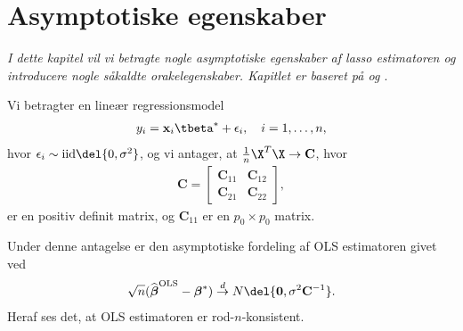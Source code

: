 \chapter{Asymptotiske egenskaber}
\textit{I dette kapitel vil vi betragte nogle asymptotiske egenskaber af lasso estimatoren og introducere nogle såkaldte orakelegenskaber.
Kapitlet er baseret på \cite{adaptive_lasso} og \cite{adaptive_lasso_knight}}.



Vi betragter en lineær regressionsmodel 
\begin{align*}
y_i= \mathbf{x}_i \tbeta^* + \epsilon_i, \quad i = 1, \ldots, n,
\end{align*}
hvor \(\epsilon_i \sim \text{iid} \del{0, \sigma^2}\), og vi antager, at \(\frac{1}{n} \X^T \X \rightarrow \textbf{C}\), hvor
\begin{align*}
\textbf{C} = 
\begin{bmatrix}
\textbf{C}_{11}& \textbf{C}_{12}\\
\textbf{C}_{21}& \textbf{C}_{22}
\end{bmatrix},
\end{align*}
er en positiv definit matrix, og $\textbf{C}_{11}$ er en $p_0 \times p_0$ matrix. 

Under denne antagelse er den asymptotiske fordeling af OLS estimatoren givet ved
\begin{align*}
\sqrt{n}(\widehat{\boldsymbol{\beta}}^{\text{OLS}}-\boldsymbol{\beta}^*) \overset{d}{\rightarrow} N \del{\mathbf{0},\sigma^2 \mathbf{C}^{-1}}.
\end{align*}
Heraf ses det, at OLS estimatoren er rod-\(n\)-konsistent.

